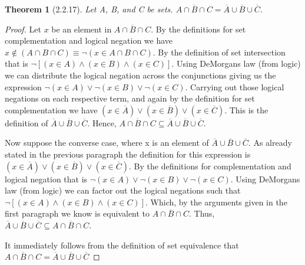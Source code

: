 \documentclass[a4paper, 12pt]{article}
\theoremstyle{plain}
\newtheorem*{theorem*}{Theorem}
\begin{document}
	
	\begin{theorem*}[2.2.17]
		Let A, B, and C be sets. 
		$\overline{A \cap B \cap C} = \overline{A} \cup \overline{B} \cup \overline {C}$.
	\end{theorem*}
	
	\begin{proof}
		Let $x$ be an element in $\overline{A \cap B \cap C}$. By the definitions for set 
		\newline complementation and logical negation we have \newline 
		$x \notin (A \cap B \cap C) \equiv \lnot (x \in A \cap B \cap C)$. By the definition of 
		set intersection that is $\lnot [(x \in A) \land (x \in B) \land (x \in C)]$. Using 
		DeMorgans law (from logic) we can distribute the logical negation across the conjunctions 
		giving us the expression $\lnot (x \in A) \lor \lnot (x \in B) \lor \lnot (x \in C)$. 
		Carrying out those logical negations on each respective term, and again by the definition 
		for set complementation we have 
		$(x \in \overline{A}) \lor (x \in \overline{B}) \lor (x \in \overline{C})$. This is the 
		definition of $\overline{A} \cup \overline{B} \cup \overline{C}$. Hence, 
		$\overline{A \cap B \cap C} \subseteq \overline{A} \cup \overline{B} \cup \overline{C}$.
		
		Now suppose the converse case, where x is an element of 
		$\overline{A} \cup \overline{B} \cup \overline{C}$. As already stated in the previous 
		paragraph the definition for this expression is 
		$(x \in \overline{A}) \lor (x \in \overline{B}) \lor (x \in \overline{C})$. By the 
		definitions for complementation and logical negation that is 
		$\lnot (x \in A) \lor \lnot (x \in B) \lor \lnot (x \in C)$. Using DeMorgans law 
		(from logic) we can factor out the logical negations such that 
		$\lnot [(x \in A) \land (x \in B) \land (x \in C)]$. Which, by the arguments given in the 
		first paragraph we know is equivalent to $\overline{A \cap B \cap C}$. Thus, 
		$\overline{A} \cup \overline{B} \cup \overline{C} \subseteq \overline{A \cap B \cap C}$.
		
		It immediately follows from the definition of set equivalence that \newline 
		$\overline{A \cap B \cap C} = \overline{A} \cup \overline{B} \cup \overline{C}$
	\end{proof}
\end{document}
